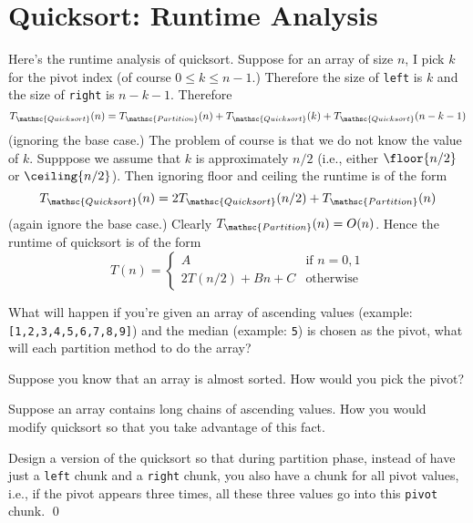 \newcommand\QUICKSORT{\mathsc{Quicksort}}
\newcommand\PARTITION{\mathsc{Partition}}

\section{Quicksort: Runtime Analysis}

Here's the runtime analysis of quicksort.
Suppose for an array of size $n$, I pick $k$ for the pivot index
(of course $0 \leq k \leq n - 1$.)
Therefore the size of \verb!left! is $k$ and the size of 
\verb!right! is $n - k - 1$.
Therefore
\[
T_\QUICKSORT(n)
=
T_{\PARTITION}(n)
+ T_{\QUICKSORT}(k)
+ T_{\QUICKSORT}(n - k - 1)
\]
(ignoring the base case.)
The problem of course is that we do not know
the value of $k$.
Supppose we assume that $k$ is approximately
$n/2$ (i.e., either 
$\floor{n/2}$ 
or 
$\ceiling{n/2}$).
Then ignoring floor and ceiling the 
runtime is of the form
\[
T_{\QUICKSORT}(n)
=
2T_{\QUICKSORT}(n/2)
+ T_{\PARTITION}(n)
\]
(again ignore the base case.)
Clearly $T_{\PARTITION}(n) = O(n)$.
Hence the runtime of quicksort is of the form
\[
T(n)
=
\begin{cases}
A & \text{if $n = 0, 1$} \\
2T(n/2) + Bn + C & \text{otherwise}
\end{cases}
\]


\newpage
\begin{ex}
What will happen if you're given an array of ascending values
(example: \verb![1,2,3,4,5,6,7,8,9]!)
and the median 
(example: \verb!5!)
is chosen as the pivot, what will each partition 
method to do the 
array?
\end{ex}


\newpage
\begin{ex}
Suppose you know that an array is almost sorted.
How would you pick the pivot?
\end{ex}


\newpage
\begin{ex}
Suppose an array contains long chains of ascending values.
How you would modify quicksort so that you take advantage of this
fact.
\end{ex}




\newpage
\begin{ex}
Design a version of the quicksort so that during partition phase,
instead of have just a \verb!left! chunk and a \verb!right! chunk,
you also have a chunk for all pivot values, i.e.,
if the pivot appears three times, all these three values go into 
this \verb!pivot! chunk.
\qed
\end{ex}


